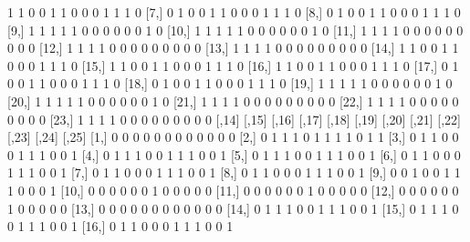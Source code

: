 \documentclass[a4paper]{article}
\begin{document}
\begin{Schunk}
\begin{Soutput}
 [6,]    1    1    0    0    1    1    0    0    0     1     1     1     0
 [7,]    0    1    0    0    1    1    0    0    0     1     1     1     0
 [8,]    0    1    0    0    1    1    0    0    0     1     1     1     0
 [9,]    1    1    1    1    1    0    0    0    0     0     0     1     0
[10,]    1    1    1    1    1    0    0    0    0     0     0     1     0
[11,]    1    1    1    1    0    0    0    0    0     0     0     0     0
[12,]    1    1    1    1    0    0    0    0    0     0     0     0     0
[13,]    1    1    1    1    0    0    0    0    0     0     0     0     0
[14,]    1    1    0    0    1    1    0    0    0     1     1     1     0
[15,]    1    1    0    0    1    1    0    0    0     1     1     1     0
[16,]    1    1    0    0    1    1    0    0    0     1     1     1     0
[17,]    0    1    0    0    1    1    0    0    0     1     1     1     0
[18,]    0    1    0    0    1    1    0    0    0     1     1     1     0
[19,]    1    1    1    1    1    0    0    0    0     0     0     1     0
[20,]    1    1    1    1    1    0    0    0    0     0     0     1     0
[21,]    1    1    1    1    0    0    0    0    0     0     0     0     0
[22,]    1    1    1    1    0    0    0    0    0     0     0     0     0
[23,]    1    1    1    1    0    0    0    0    0     0     0     0     0
      [,14] [,15] [,16] [,17] [,18] [,19] [,20] [,21] [,22] [,23] [,24] [,25]
 [1,]     0     0     0     0     0     0     0     0     0     0     0     0
 [2,]     0     1     1     1     0     1     1     1     1     0     1     1
 [3,]     0     1     1     0     0     0     1     1     1     0     0     1
 [4,]     0     1     1     1     0     0     1     1     1     0     0     1
 [5,]     0     1     1     1     0     0     1     1     1     0     0     1
 [6,]     0     1     1     0     0     0     1     1     1     0     0     1
 [7,]     0     1     1     0     0     0     1     1     1     0     0     1
 [8,]     0     1     1     0     0     0     1     1     1     0     0     1
 [9,]     0     0     1     0     0     1     1     1     0     0     0     1
[10,]     0     0     0     0     0     0     1     0     0     0     0     0
[11,]     0     0     0     0     0     0     1     0     0     0     0     0
[12,]     0     0     0     0     0     0     1     0     0     0     0     0
[13,]     0     0     0     0     0     0     0     0     0     0     0     0
[14,]     0     1     1     1     0     0     1     1     1     0     0     1
[15,]     0     1     1     1     0     0     1     1     1     0     0     1
[16,]     0     1     1     0     0     0     1     1     1     0     0     1

\end{Soutput}
\end{Schunk}
\end{document}
